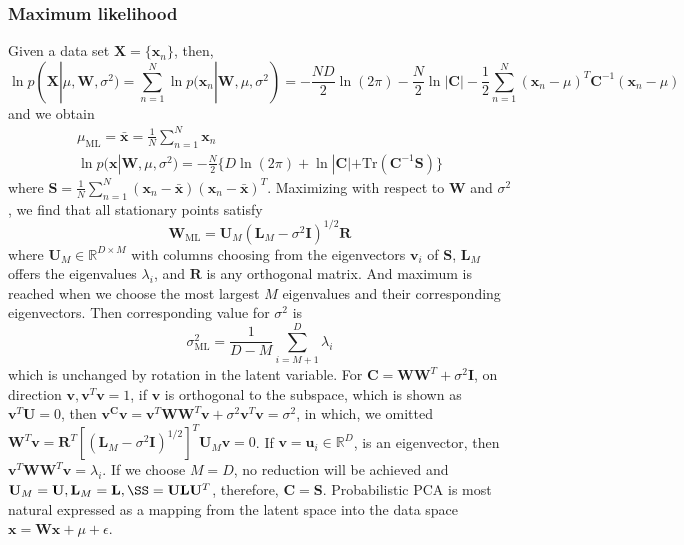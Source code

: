 \documentclass[a4paper]{book}
\newcommand{\mrm}{\mathrm}
\newcommand{\mbf}{\mathbf}
\newcommand{\UU}{\mbf U}
\newcommand{\WW}{\mbf W}
\newcommand{\CC}{\mbf C}
\newcommand{\uu}{\mbf u}
\newcommand{\vv}{\mbf v}
\newcommand{\xx}{\mbf x}
\begin{document}
\subsubsection*{Maximum likelihood}
Given a data set $\mbf X=\{\mbf x_n\}$, then,
\begin{equation}\label{}
  \ln p(\mbf X|\mu,\mbf W,\sigma^2) = \sum_{n=1}^{N}\ln p(\mbf x_n|\mbf W,\mu,\sigma^2)=-\frac{ND}{2}\ln(2\pi)-\frac{N}{2}\ln|\mbf C|-\frac{1}{2}\sum_{n=1}^{N}(\mbf x_n-\mu)^T\mbf C^{-1}(\mbf x_n-\mu)
\end{equation}
and we obtain
\begin{gather}\label{PCA.1}
  \mu_{\mrm{ML}} = \bar{\mbf x}=\frac{1}{N}\sum_{n=1}^{N}\mbf x_n \\
  \ln p(\mbf x|\mbf W,\mu,\sigma^2) = -\frac{N}{2}\{D\ln(2\pi)+\ln|\mbf C|+\mrm{Tr}(\mbf C^{-1}\mbf S)\}
\end{gather}
where $\mbf S = \frac{1}{N}\sum_{n=1}^{N}(\mbf x_n-\bar{\mbf x})(\mbf x_n-\bar{\mbf x})^T$. Maximizing with respect to $\mbf W$ and $\sigma^2$, we find that all stationary points satisfy
\begin{equation}\label{}
  \mbf W_{\mrm{ML}} = \mbf U_M(\mbf L_M-\sigma^2\mbf I)^{1/2}\mbf R
\end{equation}
where $\mbf U_M\in \mathbb{R}^{D\times M}$ with columns choosing from the eigenvectors $\mbf v_i$ of $\mbf S$, $\mbf L_M$ offers the eigenvalues $\lambda_i$, and $\mbf R$ is any orthogonal matrix. And maximum is reached when we choose the most largest $M$ eigenvalues and their corresponding eigenvectors. Then corresponding value for $\sigma^2$ is
\begin{equation}\label{}
  \sigma^2_{\mrm{ML}} = \frac{1}{D-M}\sum_{i=M+1}^{D}\lambda_i
\end{equation}
which is unchanged by rotation in the latent variable. \newline
For $\mbf C=\mbf W\mbf W^T+\sigma^2\mbf I$, on direction $\mbf v, \mbf v^T\mbf v = 1$, if $\mbf v$ is orthogonal to the subspace, which is shown as $\mbf v^T\mbf U=0$, then $\mbf v^\mbf C \mbf v = \mbf v^T\mbf {WW}^T\mbf v+\sigma^2\mbf v^T\mbf v = \sigma^2$, in which, we omitted $\mbf W^T\mbf v = \mbf R^T[(\mbf L_M-\sigma^2\mbf I)^{1/2}]^T\mbf U_M\mbf v = 0$. \newline
If $\vv = \uu_i\in \mathbb{R}^D$, is an eigenvector, then $\vv^T\WW\WW^T\vv=\lambda_i$.\newline
If we choose $M=D$, no reduction will be achieved and $\UU_M=\UU, \mbf L_M=\mbf L, \SS=\UU\mbf L\UU^T$, therefore, $\CC = \mbf S$. \newline
Probabilistic PCA is most natural expressed as a mapping from the latent space into the data space $\xx=\WW\xx+\mu+\epsilon$.
\end{document}
